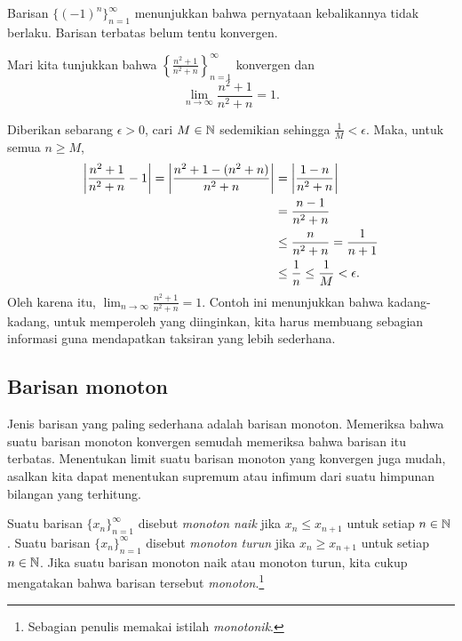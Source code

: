 Barisan $\bigl\{ {(-1)}^n \bigr\}_{n=1}^\infty$ menunjukkan bahwa pernyataan kebalikannya
tidak berlaku.  Barisan terbatas belum tentu konvergen.

\begin{example}
Mari kita tunjukkan bahwa $\left\{ \frac{n^2+1}{n^2+n} \right\}_{n=1}^\infty$ konvergen dan
\begin{equation*}
\lim_{n\to\infty} \frac{n^2+1}{n^2+n} = 1 .
\end{equation*}

Diberikan sebarang $\epsilon > 0$,
cari $M \in {\mathbb{N}}$ sedemikian sehingga $\frac{1}{M} < \epsilon$.  Maka, untuk semua $n \geq
M$,
\begin{equation*}
\begin{split}
\left\lvert {\frac{n^2+1}{n^2+n} - 1} \right\rvert  =
\left\lvert {\frac{n^2+1 - (n^2+n)}{n^2+n}} \right\rvert
& =
\left\lvert {\frac{1 - n}{n^2+n}} \right\rvert \\
& =
\frac{n-1}{n^2+n} \\
& \leq 
\frac{n}{n^2+n} 
 =
\frac{1}{n+1}  \\
& \leq \frac{1}{n}
\leq \frac{1}{M} < \epsilon .
\end{split}
\end{equation*}
Oleh karena itu,
$\lim_{n\to\infty} \frac{n^2+1}{n^2+n} = 1$.
Contoh ini menunjukkan bahwa kadang-kadang, untuk memperoleh yang diinginkan, kita harus membuang
sebagian informasi guna mendapatkan taksiran yang lebih sederhana.
\end{example}

\subsection{Barisan monoton}

Jenis barisan yang paling sederhana adalah barisan monoton.  Memeriksa bahwa
suatu barisan monoton konvergen semudah memeriksa bahwa barisan itu terbatas.
Menentukan
limit suatu barisan monoton
yang konvergen juga mudah, asalkan kita dapat menentukan supremum atau infimum
dari suatu himpunan bilangan yang terhitung.

\begin{defn}
Suatu barisan $\{ x_n \}_{n=1}^\infty$ disebut \emph{monoton naik} jika $x_n \leq x_{n+1}$ untuk setiap $n \in {\mathbb{N}}$.  
%
Suatu barisan $\{ x_n \}_{n=1}^\infty$ disebut \emph{monoton turun} jika $x_n \geq x_{n+1}$ untuk setiap $n \in {\mathbb{N}}$.  
%
Jika suatu barisan monoton naik atau monoton turun, kita
cukup mengatakan bahwa barisan tersebut \emph{monoton}.\footnote{Sebagian
penulis memakai istilah \emph{monotonik}.}
\end{defn}

